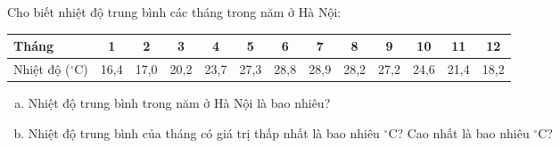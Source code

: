 \begin{bt}
	Cho biết nhiệt độ trung bình các tháng trong năm ở Hà Nội:
	\begin{center}
	\begin{tabular}{|l|c|c|c|c|c|c|c|c|c|c|c|c|}
		\hline
		Tháng & 1 & 2 & 3 & 4 & 5 & 6 & 7 & 8 & 9 & 10 & 11 & 12 \\
		\hline
		Nhiệt độ ($^\circ\text{C}$) & 16,4 & 17,0 & 20,2 & 23,7 & 27,3 & 28,8 & 28,9 & 28,2 & 27,2 & 24,6 & 21,4 & 18,2 \\
		\hline
	\end{tabular}
	\end{center}
	\begin{enumerate}[a)]
		\item Nhiệt độ trung bình trong năm ở Hà Nội là bao nhiêu?
		\item Nhiệt độ trung bình của tháng có giá trị thấp nhất là bao nhiêu $^\circ\text{C}$? Cao nhất là bao nhiêu $^\circ\text{C}$?
	\end{enumerate}
\end{bt}

